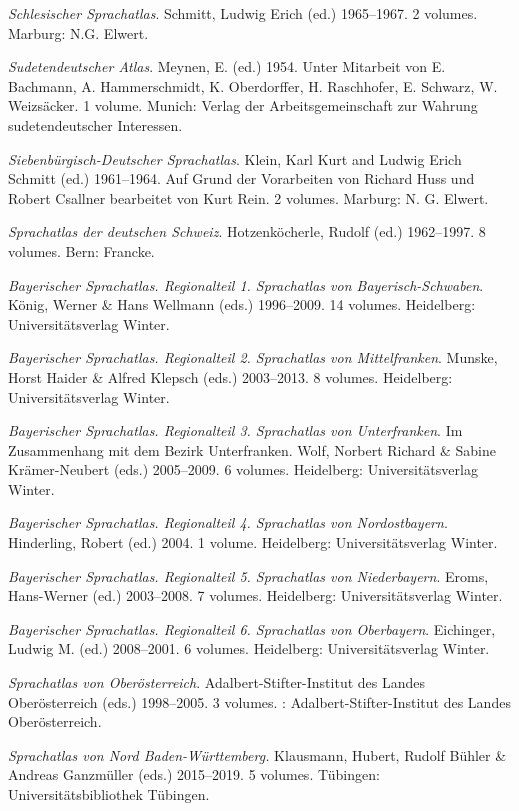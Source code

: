 \begin{description}[font=\normalfont]
\item[SchlSA:]   \textit{Schlesischer Sprachatlas}. Schmitt, Ludwig Erich (ed.) 1965--1967. 2 volumes. Marburg: N.G. Elwert.
\item[SDA:] \textit{Sudetendeutscher Atlas}. Meynen, E. (ed.) 1954. Unter Mitarbeit von E. Bachmann, A. Hammerschmidt, K. Oberdorffer, H. Raschhofer, E. Schwarz, W. Weizsäcker.  1 volume. Munich: Verlag der Arbeitsgemeinschaft zur Wahrung sudetendeutscher Interessen.
\item[SDSA:] \textit{Siebenbürgisch-Deutscher Sprachatlas}. Klein, Karl Kurt and Ludwig Erich Schmitt (ed.) 1961--1964. Auf Grund der Vorarbeiten von Richard Huss und Robert Csallner bearbeitet von Kurt Rein.  2 volumes. Marburg: N. G. Elwert.
\item[SDS:] \textit{Sprachatlas der deutschen Schweiz}. Hotzenköcherle, Rudolf (ed.) 1962--1997. 8 volumes. Bern: Francke.
\item[SBS:] \textit{Bayerischer Sprachatlas. Regionalteil 1. Sprachatlas von Bayerisch-Schwaben}. König, Werner \& Hans Wellmann (eds.) 1996--2009. 14 volumes. Heidelberg: Universitätsverlag Winter.
\item[SMF:] \textit{Bayerischer Sprachatlas. Regionalteil 2. Sprachatlas von Mittelfranken}. Munske, Horst Haider \& Alfred Klepsch (eds.) 2003--2013. 8 volumes. Heidelberg: Universitätsverlag Winter.
\item[SUF:] \textit{Bayerischer Sprachatlas. Regionalteil 3. Sprachatlas von Unterfranken}. Im Zusammenhang mit dem Bezirk Unterfranken. Wolf, Norbert Richard \& Sabine Krämer-Neubert (eds.) 2005--2009. 6 volumes. Heidelberg: Universitätsverlag Winter.
\item[SNOB:] \textit{Bayerischer Sprachatlas. Regionalteil 4. Sprachatlas von Nordostbayern}. Hinderling, Robert (ed.) 2004. 1 volume.  Heidelberg: Universitätsverlag Winter.
\item[SNiB:] \textit{Bayerischer Sprachatlas. Regionalteil 5. Sprachatlas von Niederbayern}. Eroms, Hans-Werner (ed.) 2003--2008. 7 volumes.  Heidelberg: Universitätsverlag Winter.
\item[SOB:] \textit{Bayerischer Sprachatlas. Regionalteil 6. Sprachatlas von Oberbayern}. Eichinger, Ludwig M. (ed.) 2008--2001. 6 volumes.  Heidelberg: Universitätsverlag Winter.
\item[SAO:] \textit{Sprachatlas von Oberösterreich}. Adalbert-Stifter-Institut des Landes Oberösterreich (eds.) 1998--2005. 3 volumes. : Adalbert-Stifter-Institut des Landes Oberösterreich.
\item[SNBW:] \textit{Sprachatlas von Nord Baden-Württemberg.} Klausmann, Hubert, Rudolf Bühler \& Andreas Ganzmüller (eds.) 2015--2019. 5 volumes. Tübingen: Universitätsbibliothek Tübingen.

\end{description}

